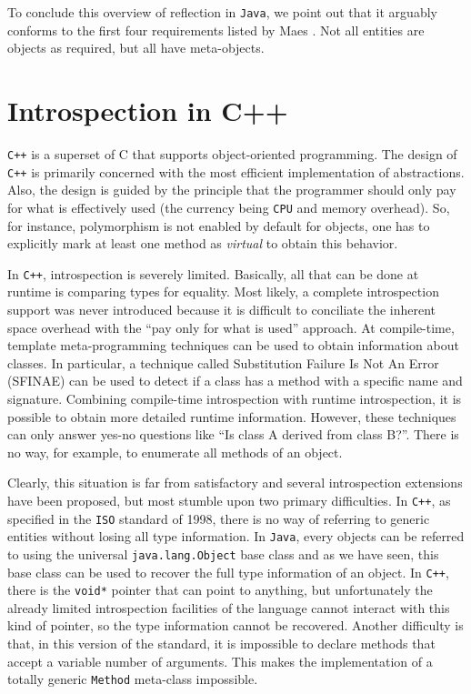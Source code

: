 To conclude this overview of reflection in \texttt{Java}, we point out that it arguably conforms to the first four requirements listed by
Maes \cite{Maes}. Not all entities are objects as required, but all have meta-objects.

\section{Introspection in C++}

\texttt{C++} is a superset of C that supports object-oriented programming. The design of \texttt{C++} is primarily concerned with the most efficient
implementation of abstractions. Also, the design is guided by the principle that the programmer should only pay for what
is effectively used (the currency being \texttt{CPU} and memory overhead). So, for instance, polymorphism is not enabled by default
for objects, one has to explicitly mark at least one method as \emph{virtual} to obtain this behavior.

In \texttt{C++}, introspection is severely limited. Basically, all that can be done at runtime is comparing types for equality. Most likely, a complete
introspection support was never introduced because it is difficult to conciliate the inherent space overhead with the ``pay only for what
is used'' approach. At compile-time, template meta-programming techniques can be used to obtain information about classes.
In particular, a technique called Substitution Failure Is Not An Error (SFINAE) can be used to detect if a class has a method with
a specific name and signature. Combining compile-time introspection with runtime introspection, it is possible to obtain more
detailed runtime information. However, these techniques can only answer yes-no questions like ``Is class A derived from class B?''.
There is no way, for example, to enumerate all methods of an object.

Clearly, this situation is far from satisfactory and several introspection extensions have been proposed, but most stumble upon
two primary difficulties. In \texttt{C++}, as specified in the \texttt{ISO} standard of 1998, there is no way of referring to generic entities 
without losing all type information. In \texttt{Java}, every objects can be referred to using the universal \texttt{java.lang.Object} base class
and as we have seen, this base class can be used to recover the full type information of an object. In \texttt{C++}, there is the \texttt{void*}
pointer that can point to anything, but unfortunately the already limited introspection facilities of the language cannot interact
with this kind of pointer, so the type information cannot be recovered. Another difficulty is that, in this version of the standard,
it is impossible to declare methods that accept a variable number of arguments. This makes the implementation of a totally generic
\texttt{Method} meta-class impossible.

